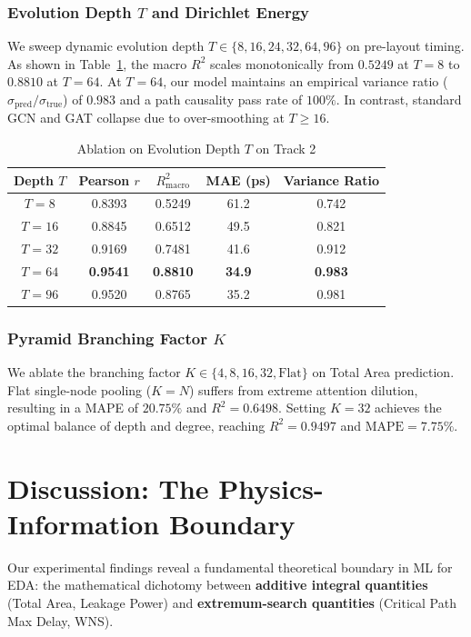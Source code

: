 \documentclass[conference]{IEEEtran}
\begin{document}
\subsubsection{Evolution Depth $T$ and Dirichlet Energy}
We sweep dynamic evolution depth $T \in \{8, 16, 24, 32, 64, 96\}$ on pre-layout timing. As shown in Table~\ref{tab:ablation_depth}, the macro $R^2$ scales monotonically from $0.5249$ at $T=8$ to $0.8810$ at $T=64$. At $T=64$, our model maintains an empirical variance ratio ($\sigma_{\text{pred}} / \sigma_{\text{true}}$) of $\mathbf{0.983}$ and a path causality pass rate of $100\%$. In contrast, standard GCN and GAT collapse due to over-smoothing at $T \ge 16$.

\begin{table}[h]
\centering
\caption{Ablation on Evolution Depth $T$ on Track 2}
\label{tab:ablation_depth}
\begin{tabular}{ccccc}
\toprule
\textbf{Depth $T$} & \textbf{Pearson $r$} & \textbf{$R^2_{\text{macro}}$} & \textbf{MAE (ps)} & \textbf{Variance Ratio} \\
\midrule
$T=8$  & 0.8393 & 0.5249 & 61.2 & 0.742 \\
$T=16$ & 0.8845 & 0.6512 & 49.5 & 0.821 \\
$T=32$ & 0.9169 & 0.7481 & 41.6 & 0.912 \\
$T=64$ & \textbf{0.9541} & \textbf{0.8810} & \textbf{34.9} & \textbf{0.983} \\
$T=96$ & 0.9520 & 0.8765 & 35.2 & 0.981 \\
\bottomrule
\end{tabular}
\end{table}

\subsubsection{Pyramid Branching Factor $K$}
We ablate the branching factor $K \in \{4, 8, 16, 32, \text{Flat}\}$ on Total Area prediction. Flat single-node pooling ($K=N$) suffers from extreme attention dilution, resulting in a MAPE of $20.75\%$ and $R^2 = 0.6498$. Setting $K=32$ achieves the optimal balance of depth and degree, reaching $R^2 = 0.9497$ and $\text{MAPE} = 7.75\%$.

\section{Discussion: The Physics-Information Boundary}
Our experimental findings reveal a fundamental theoretical boundary in ML for EDA: the mathematical dichotomy between \textbf{additive integral quantities} (Total Area, Leakage Power) and \textbf{extremum-search quantities} (Critical Path Max Delay, WNS). 
\end{document}
